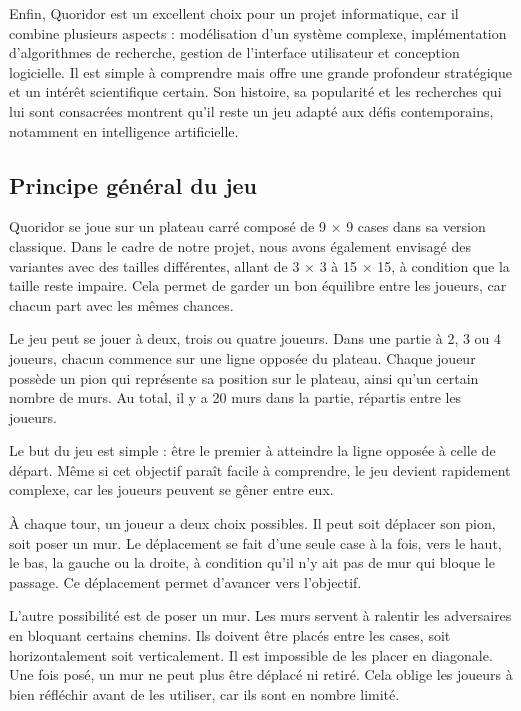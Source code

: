 \documentclass[a4paper]{article}
\begin{document}
Enfin, Quoridor est un excellent choix pour un projet informatique, car il combine plusieurs aspects : modélisation d’un système complexe, implémentation d’algorithmes de recherche, gestion de l’interface utilisateur et conception logicielle. Il est simple à comprendre mais offre une grande profondeur stratégique et un intérêt scientifique certain. Son histoire, sa popularité et les recherches qui lui sont consacrées montrent qu’il reste un jeu adapté aux défis contemporains, notamment en intelligence artificielle.

\subsection{Principe général du jeu}

Quoridor se joue sur un plateau carré composé de 9 × 9 cases dans sa version classique. Dans le cadre de notre projet, nous avons également envisagé des variantes avec des tailles différentes, allant de 3 × 3 à 15 × 15, à condition que la taille reste impaire. Cela permet de garder un bon équilibre entre les joueurs, car chacun part avec les mêmes chances.

Le jeu peut se jouer à deux, trois ou quatre joueurs. Dans une partie à 2, 3 ou 4 joueurs, chacun commence sur une ligne opposée du plateau. Chaque joueur possède un pion qui représente sa position sur le plateau, ainsi qu’un certain nombre de murs. Au total, il y a 20 murs dans la partie, répartis entre les joueurs.

Le but du jeu est simple : être le premier à atteindre la ligne opposée à celle de départ. Même si cet objectif paraît facile à comprendre, le jeu devient rapidement complexe, car les joueurs peuvent se gêner entre eux.

À chaque tour, un joueur a deux choix possibles. Il peut soit déplacer son pion, soit poser un mur. Le déplacement se fait d’une seule case à la fois, vers le haut, le bas, la gauche ou la droite, à condition qu’il n’y ait pas de mur qui bloque le passage. Ce déplacement permet d’avancer vers l’objectif.

L’autre possibilité est de poser un mur. Les murs servent à ralentir les adversaires en bloquant certains chemins. Ils doivent être placés entre les cases, soit horizontalement soit verticalement. Il est impossible de les placer en diagonale. Une fois posé, un mur ne peut plus être déplacé ni retiré. Cela oblige les joueurs à bien réfléchir avant de les utiliser, car ils sont en nombre limité.
\end{document}
